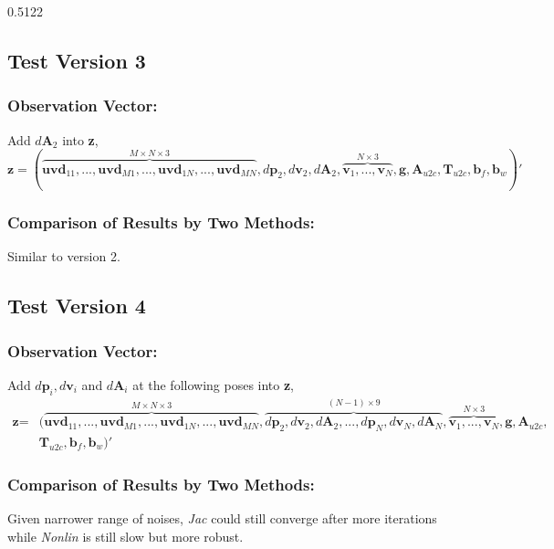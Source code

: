 \documentclass[12pt]{article}   %
\begin{document}
    0.5122


\subsection{Test Version 3}
\subsubsection{Observation Vector:}
Add $d\textbf{A}_2$ into \textbf{z},
$$\textbf{z} = (\overbrace{\textbf{uvd}_{11}, ... , \textbf{uvd}_{M1}, ..., \textbf{uvd}_{1N}, ... , \textbf{uvd}_{MN}}^{M \times N \times 3}, d\textbf{p}_2, d\textbf{v}_2, d\textbf{A}_2, \overbrace{\textbf{v}_1, ..., \textbf{v}_{N}}^{N \times 3},  \textbf{g}, \textbf{A}_{u2c}, \textbf{T}_{u2c}, \textbf{b}_f, \textbf{b}_w)' $$

\subsubsection{Comparison of Results by Two Methods:}	

Similar to version 2.


\subsection{Test Version 4}
\subsubsection{Observation Vector:}
Add $d\textbf{p}_i, d\textbf{v}_i$ and $d\textbf{A}_i$ at the following poses into \textbf{z},
\begin{align*}
\textbf{z}=&(\overbrace{\textbf{uvd}_{11}, ... , \textbf{uvd}_{M1}, ..., \textbf{uvd}_{1N}, ... , \textbf{uvd}_{MN}}^{M \times N \times 3}, \overbrace{d\textbf{p}_2, d\textbf{v}_2, d\textbf{A}_2, ..., d\textbf{p}_N, d\textbf{v}_N, d\textbf{A}_N}^{(N-1) \times 9}, \overbrace{\textbf{v}_1, ..., \textbf{v}_{N}}^{N \times 3},  \textbf{g}, \textbf{A}_{u2c},\\
 &\textbf{T}_{u2c}, \textbf{b}_f, \textbf{b}_w)' 
 \end{align*}

\subsubsection{Comparison of Results by Two Methods:}	

Given narrower range of noises, \textit{Jac} could still converge after more iterations while \textit{Nonlin} is still slow but more robust.
\end{document}
